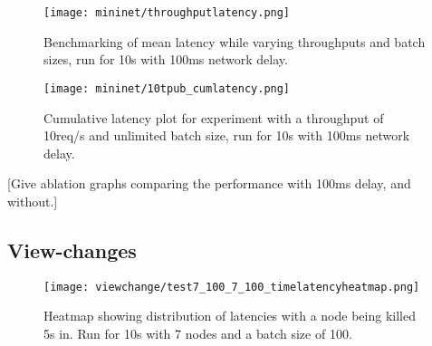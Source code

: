 \begin{figure}[h!]
\centering
\texttt{[image: mininet/throughputlatency.png]}
\caption{Benchmarking of mean latency while varying throughputs and batch sizes, run for 10s with 100ms network delay.}
\end{figure}

\begin{figure}[h!]
\centering
\texttt{[image: mininet/10tpub\_cumlatency.png]}
\caption{Cumulative latency plot for experiment with a throughput of 10req/s and unlimited batch size, run for 10s with 100ms network delay.}
\end{figure}

[Give ablation graphs comparing the performance with 100ms delay, and without.]

\subsection{View-changes} \label{viewchangeeval}

\begin{figure}[h!]
\centering
\texttt{[image: viewchange/test7\_100\_7\_100\_timelatencyheatmap.png]}
\caption{Heatmap showing distribution of latencies with a node being killed 5s in. Run for 10s with 7 nodes and a batch size of 100.}
\end{figure}








